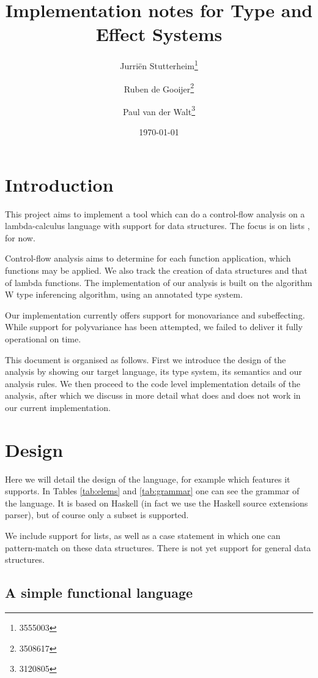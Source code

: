 \documentclass[a4paper]{article}
\author{Jurri\"en Stutterheim\footnote{3555003}\and Ruben de Gooijer\footnote{3508617}\and Paul van der Walt\footnote{3120805}}
\date{\today}
\title{Implementation notes for Type and Effect Systems}
\begin{document}
\maketitle \tableofcontents

\section{Introduction}

This project aims to implement a tool which can do a control-flow analysis on a
lambda-calculus language with support for data structures. The focus is on
lists%
, for now.

Control-flow analysis aims to determine for each function application, which
functions may be applied. We also track the creation of data structures and that
of lambda functions. The implementation of our analysis is built on the
algorithm W type inferencing algorithm, using an annotated type system.

Our implementation currently offers support for monovariance and subeffecting.
While support for polyvariance has been attempted, we failed to deliver it fully
operational on time.

This document is organised as follows. First we introduce the design of the
analysis by showing our target language, its type system, its semantics and
our analysis rules. We then proceed to the code level implementation details of
the analysis, after which we discuss in more detail what does and does not work
in our current implementation.

\section{Design}

Here we will detail the design of the language, for example which features it
supports. In Tables \ref{tab:elems} and \ref{tab:grammar} one can see the
grammar of the language. It is based on Haskell (in fact we use the Haskell
source extensions parser), but of course only a subset is supported. 

We include support for%
 lists, as well as a case statement in which one
can pattern-match on these data structures. There is not yet support for general
data structures.

\subsection{A simple functional language}
\end{document}
